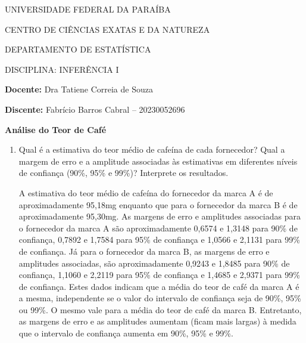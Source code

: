\documentclass[11pt]{article}
\begin{document}
\begin{center}
UNIVERSIDADE FEDERAL DA PARAÍBA

CENTRO DE CIÊNCIAS EXATAS E DA NATUREZA

DEPARTAMENTO DE ESTATÍSTICA

DISCIPLINA: INFERÊNCIA I
\end{center}

\textbf{Docente:} Dra Tatiene Correia de Souza

\textbf{Discente:} Fabrício Barros Cabral -- 20230052696

\begin{center}
{\Large \textbf{Análise do Teor de Café}}
\end{center}

\begin{enumerate}
    \item Qual é a estimativa do teor médio de cafeína de cada fornecedor? Qual
    a margem de erro e a amplitude associadas às estimativas em diferentes
    níveis de confiança (90\%, 95\% e 99\%)? Interprete os resultados.

    A estimativa do teor médio de cafeína do fornecedor da marca A é de
    aproximadamente 95,18mg enquanto que para o fornecedor da marca B é de
    aproximadamente 95,30mg. As margens de erro e amplitudes associadas para
    o fornecedor da marca A são aproximadamente 0,6574 e 1,3148 para 90\% de
    confiança, 0,7892 e 1,7584 para 95\% de confiança e 1,0566 e 2,1131 para
    99\% de confiança. Já para o fornecedor da marca B, as margens de erro e
    amplitudes associadas, são aproximadamente 0,9243 e 1,8485 para 90\% de
    confiança, 1,1060 e 2,2119 para 95\% de confiança e 1,4685 e 2,9371 para
    99\% de confiança. Estes dados indicam que a média do teor de café da marca
    A é a mesma, independente se o valor do intervalo de confiança seja de 90\%,
    95\% ou 99\%. O mesmo vale para a média do teor de café da marca B.
    Entretanto, as margens de erro e as amplitudes aumentam (ficam mais largas)
    à medida que o intervalo de confiança aumenta em 90\%, 95\% e 99\%.


\end{enumerate}
\end{document}
